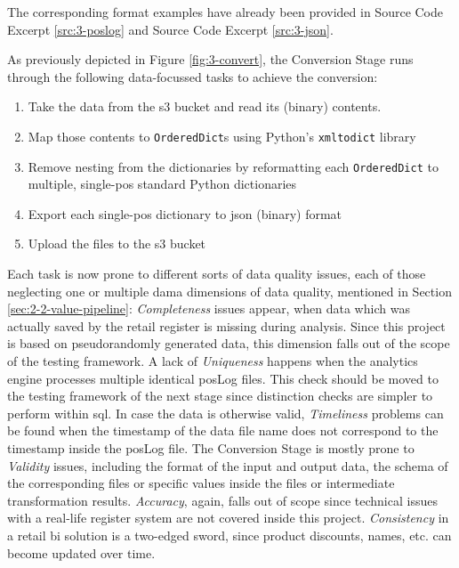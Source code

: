 The corresponding format examples have already been provided in Source Code Excerpt \ref{src:3-poslog} and Source Code Excerpt \ref{src:3-json}.

As previously depicted in Figure \ref{fig:3-convert}, the Conversion Stage runs through the following data-focussed tasks to achieve the conversion:

\begin{enumerate}
	\item Take the data from the \ac{s3} bucket and read its (binary) contents.
	\item Map those contents to \texttt{OrderedDict}s using Python's \texttt{xmltodict} library
	\item Remove nesting from the dictionaries by reformatting each \texttt{OrderedDict} to multiple, single-\ac{pos} standard Python dictionaries
	\item Export each single-\ac{pos} dictionary to \ac{json} (binary) format
	\item Upload the files to the \ac{s3} bucket
\end{enumerate}

Each task is now prone to different sorts of data quality issues, each of those neglecting one or multiple \ac{dama} dimensions of data quality, mentioned in Section \ref{sec:2-2-value-pipeline}: \textit{Completeness} issues appear, when data which was actually saved by the retail register is missing during analysis. Since this project is based on pseudorandomly generated data, this dimension falls out of the scope of the testing framework. A lack of \textit{Uniqueness} happens when the analytics engine processes multiple identical \ac{pos}Log files. This check should be moved to the testing framework of the next stage since distinction checks are simpler to perform within \ac{sql}. In case the data is otherwise valid, \textit{Timeliness} problems can be found when the timestamp of the data file name does not correspond to the timestamp inside the \ac{pos}Log file. The Conversion Stage is mostly prone to \textit{Validity} issues, including the format of the input and output data, the schema of the corresponding files or specific values inside the files or intermediate transformation results. \textit{Accuracy}, again, falls out of scope since technical issues with a real-life register system are not covered inside this project.  \textit{Consistency} in a retail \ac{bi} solution is a two-edged sword, since product discounts, names, etc. can become updated over time.

